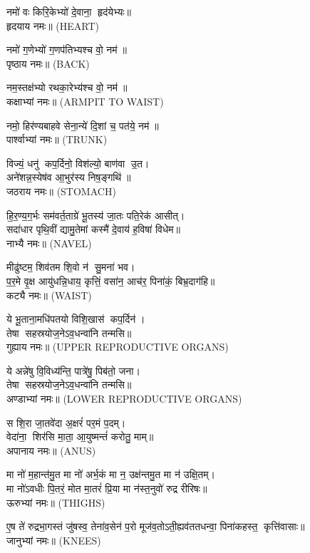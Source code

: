 नमो॑ वः किरि॒केभ्यो॑ दे॒वाना॒ हृद॑येभ्यः॥\\
हृदयाय नमः॥ {\scriptsize (HEART)}

नमो॑ ग॒णेभ्यो॑ ग॒णप॑तिभ्यश्च वो॒ नम॑॥\\
पृष्ठाय नमः॥ {\scriptsize (BACK)}

नम॒स्तक्ष॑भ्यो रथका॒रेभ्य॑श्च वो॒ नम॑॥\\
कक्षाभ्यां नमः॥ {\scriptsize (ARMPIT TO WAIST)}

नमो॒ हिर॑ण्यबाहवे सेना॒न्ये॑ दि॒शां च॒ पत॑ये॒ नम॑॥\\
पार्श्वाभ्यां नमः॥ {\scriptsize (TRUNK)}

 विज्यं॒ धनु॑ कप॒र्दिनो॒ विश॑ल्यो॒ बाण॑वा उ॒त।\\
 अने॑शन्न॒स्येष॑व आ॒भुर॑स्य निष॒ङ्गथि॑॥\\
जठराय नमः॥ {\scriptsize (STOMACH)}


हि॒र॒ण्य॒ग॒र्भः सम॑वर्त॒ताग्रे॑ भू॒तस्य॑ जा॒तः पति॒रेक॑ आसीत्।\\
सदा॑धार पृथि॒वीं द्यामु॒तेमां कस्मै॑ दे॒वाय॑ ह॒विषा॑ विधेम॥\\
नाभ्यै नमः॥ {\scriptsize (NAVEL)}

मीढु॑ष्टम॒ शिव॑तम शि॒वो न॑ सु॒मना॑ भव।\\
 प॒र॒मे वृ॒क्ष आयु॑धन्नि॒धाय॒ कृत्तिं॒ वसा॑न॒ आच॑र॒ पिना॑कं॒ बिभ्र॒दाग॑हि॥\\
कट्यै नमः॥ {\scriptsize (WAIST)}

 ये भू॒ताना॒मधि॑पतयो विशि॒खास॑ कप॒र्दिन॑। \\
तेषा सहस्रयोज॒नेऽव॒धन्वा॑नि तन्मसि॥ \\
गुह्याय नमः॥ {\scriptsize (UPPER REPRODUCTIVE ORGANS)}

ये अन्ने॑षु वि॒विध्य॑न्ति॒ पात्रे॑षु॒ पिब॑तो॒ जना\sn{}।\\
तेषा सहस्रयोज॒नेऽव॒धन्वा॑नि तन्मसि॥ \\
अण्डाभ्यां नमः॥ {\scriptsize (LOWER REPRODUCTIVE ORGANS)}

स शि॒रा जा॒तवे॑दा अ॒क्षरं॑ पर॒मं प॒दम्।\\
वेदा॑ना॒ शिर॑सि मा॒ता॒ आ॒युष्मन्तं॑ करोतु॒ माम्॥\\
अपानाय नमः॥ {\scriptsize (ANUS)}

मा नो॑ म॒हान्त॑मु॒त मा नो॑ अर्भ॒कं मा न॒ उक्ष॑न्तमु॒त मा न॑ उक्षि॒तम्।\\
 मा नो॑ऽवधीः पि॒तरं॒ मोत मा॒तरं॑ प्रि॒या मा न॑स्त॒नुवो॑ रुद्र रीरिषः॥\\
ऊरुभ्यां नमः॥ {\scriptsize (THIGHS)}

ए॒ष ते॑ रुद्रभा॒गस्तं जु॑षस्व॒ तेना॑व॒सेन॑ प॒रो मूज॑व॒तोऽती॒ह्यव॑ततधन्वा॒ पिना॑कहस्त॒ कृत्ति॑वासाः॥\\
जानुभ्यां नमः॥ {\scriptsize (KNEES)}

